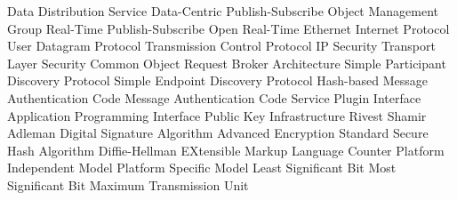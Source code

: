      {Data Distribution Service}
    {Data-Centric Publish-Subscribe}
     {Object Management Group}
    {Real-Time Publish-Subscribe}
    {Open Real-Time Ethernet}
      {Internet Protocol}
     {User Datagram Protocol}
     {Transmission Control Protocol}
   {IP Security}
     {Transport Layer Security}
   {Common Object Request Broker Architecture}
    {Simple Participant Discovery Protocol}
    {Simple Endpoint Discovery Protocol}
    {Hash-based Message Authentication Code}
     {Message Authentication Code}
     {Service Plugin Interface}
     {Application Programming Interface}
     {Public Key Infrastructure}
     {Rivest Shamir Adleman}
     {Digital Signature Algorithm}
     {Advanced Encryption Standard}
     {Secure Hash Algorithm}
      {Diffie-Hellman}
     {EXtensible Markup Language}
     {Counter}
     {Platform Independent Model}
     {Platform Specific Model}
     {Least Significant Bit}
     {Most Significant Bit}
     {Maximum Transmission Unit}
